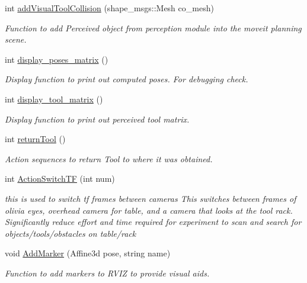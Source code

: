 \begin{DoxyCompactItemize}
int \hyperlink{structManipulate_a39959395c5ee7d305eb9f1a306166abb}{add\+Visual\+Tool\+Collision} (shape\+\_\+msgs\+::\+Mesh co\+\_\+mesh)
\begin{DoxyCompactList}\small\item\em Function to add Perceived object from perception module into the moveit planning scene. \end{DoxyCompactList}\item 
int \hyperlink{structManipulate_a9d9985f555d6eae5ed7baa77fe8b0969}{display\+\_\+poses\+\_\+matrix} ()
\begin{DoxyCompactList}\small\item\em Display function to print out computed poses. For debugging check. \end{DoxyCompactList}\item 
int \hyperlink{structManipulate_a4933228a7e9745630d8a4e529bdc2e98}{display\+\_\+tool\+\_\+matrix} ()
\begin{DoxyCompactList}\small\item\em Display function to print out perceived tool matrix. \end{DoxyCompactList}\item 
int \hyperlink{structManipulate_aa62490b6991acbd41e7bcefe76523374}{return\+Tool} ()
\begin{DoxyCompactList}\small\item\em Action sequences to return Tool to where it was obtained. \end{DoxyCompactList}\item 
int \hyperlink{structManipulate_a51cda8e5d51dad3a8b7a75484e803bd8}{Action\+Switch\+TF} (int num)
\begin{DoxyCompactList}\small\item\em this is used to switch tf frames between cameras This switches between frames of olivia eyes, overhead camera for table, and a camera that looks at the tool rack. Significantly reduce effort and time required for experiment to scan and search for objects/tools/obstacles on table/rack \end{DoxyCompactList}\item 
void \hyperlink{structManipulate_aec1aa248a881c3f2c7c42d2a33f064ed}{Add\+Marker} (Affine3d pose, string name)
\begin{DoxyCompactList}\small\item\em Function to add markers to R\+V\+IZ to provide visual aids. \end{DoxyCompactList}\item 
\mbox{\label{structManipulate_a71a59840948b21a66265da53b09bf94d}} 

\end{DoxyCompactItemize}
